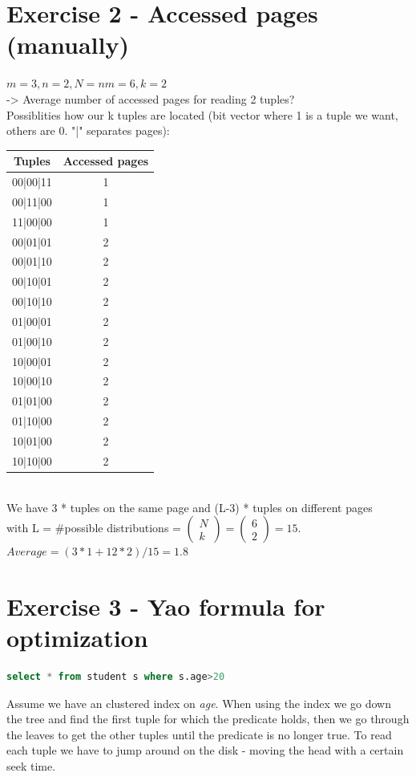 \documentclass[11pt,a4paper]{scrartcl}
\begin{document}
\section*{Exercise 2 - Accessed pages (manually)}
$m = 3, n = 2, N = nm = 6, k = 2$\\
-> Average number of accessed pages for reading 2 tuples?\\
Possiblities how our k tuples are located (bit vector where 1 is a tuple we want, others are 0. "|" separates pages):\\
\begin{tabular}{|c|c|}
\hline
Tuples & Accessed pages\\
\hline
00|00|11 & 1\\
00|11|00 & 1\\
11|00|00 & 1\\
00|01|01 & 2\\
00|01|10 & 2\\
00|10|01 & 2\\
00|10|10 & 2\\
01|00|01 & 2\\
01|00|10 & 2\\
10|00|01 & 2\\
10|00|10 & 2\\
01|01|00 & 2\\
01|10|00 & 2\\
10|01|00 & 2\\
10|10|00 & 2\\
\hline
\end{tabular}\\
We have 3 * tuples on the same page and (L-3) * tuples on different pages\\
with L = \#possible distributions = $\begin{pmatrix} N \\ k \end{pmatrix} = \begin{pmatrix} 6 \\ 2 \end{pmatrix} = 15$.\\
$Average = (3*1 + 12*2)/15 = 1.8$\\

\section*{Exercise 3 - Yao formula for optimization}
\begin{lstlisting}[language=SQL]
select * from student s where s.age>20
\end{lstlisting}
Assume we have an clustered index on \textit{age}. When using the index we go down the tree and find the first tuple for which the predicate holds, then we go through the leaves to get the other tuples until the predicate is no longer true.
To read each tuple we have to jump around on the disk - moving the head with a certain seek time.
\end{document}
